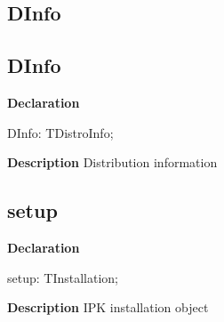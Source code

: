 \documentclass{report}
\newif\ifpdf
\begin{document}
\subsection*{\large{\textbf{DInfo}}\normalsize\hspace{1ex}\hrulefill}
\else
\subsection*{DInfo}
\fi
\label{igobase-DInfo}
\begin{list}{}{
\setlength{\itemindent}{0cm}
\setlength{\listparindent}{0cm}
\setlength{\leftmargin}{\evensidemargin}
\addtolength{\leftmargin}{\tmplength}
\settowidth{\labelsep}{X}
\addtolength{\leftmargin}{\labelsep}
\setlength{\labelwidth}{\tmplength}
}
\item[\textbf{Declaration}\hfill]
\ifpdf
\begin{flushleft}
\fi
\begin{ttfamily}
DInfo: TDistroInfo;\end{ttfamily}

\ifpdf
\end{flushleft}
\fi

\par
\item[\textbf{Description}]
Distribution information

\end{list}
\ifpdf
\subsection*{\large{\textbf{setup}}\normalsize\hspace{1ex}\hrulefill}
\else
\subsection*{setup}
\fi
\label{igobase-setup}
\begin{list}{}{
\setlength{\itemindent}{0cm}
\setlength{\listparindent}{0cm}
\setlength{\leftmargin}{\evensidemargin}
\addtolength{\leftmargin}{\tmplength}
\settowidth{\labelsep}{X}
\addtolength{\leftmargin}{\labelsep}
\setlength{\labelwidth}{\tmplength}
}
\item[\textbf{Declaration}\hfill]
\ifpdf
\begin{flushleft}
\fi
\begin{ttfamily}
setup: TInstallation;\end{ttfamily}

\ifpdf
\end{flushleft}
\fi

\par
\item[\textbf{Description}]
IPK installation object

\end{list}
\end{document}
